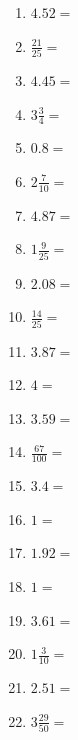 \documentclass[12pt]{article}
\begin{document}
\begin{enumerate}
\item \large $ 4.52 = $ \vspace{1.5cm}
\newpage
\item \large $ \frac{21}{25} = $ \vspace{1.5cm}
\item \large $ 4.45 = $ \vspace{1.5cm}
\item \large $ 3 \frac{3}{4} = $ \vspace{1.5cm}
\item \large $ 0.8 = $ \vspace{1.5cm}
\item \large $ 2 \frac{7}{10} = $ \vspace{1.5cm}
\item \large $ 4.87 = $ \vspace{1.5cm}
\item \large $ 1 \frac{9}{25} = $ \vspace{1.5cm}
\item \large $ 2.08 = $ \vspace{1.5cm}
\item \large $ \frac{14}{25} = $ \vspace{1.5cm}
\item \large $ 3.87 = $ \vspace{1.5cm}
\newpage
\item \large $ 4 = $ \vspace{1.5cm}
\item \large $ 3.59 = $ \vspace{1.5cm}
\item \large $ \frac{67}{100} = $ \vspace{1.5cm}
\item \large $ 3.4 = $ \vspace{1.5cm}
\item \large $ 1 = $ \vspace{1.5cm}
\item \large $ 1.92 = $ \vspace{1.5cm}
\item \large $ 1 = $ \vspace{1.5cm}
\item \large $ 3.61 = $ \vspace{1.5cm}
\item \large $ 1 \frac{3}{10} = $ \vspace{1.5cm}
\item \large $ 2.51 = $ \vspace{1.5cm}
\newpage
\item \large $ 3 \frac{29}{50} = $ \vspace{1.5cm}

\end{enumerate}
\end{document}
